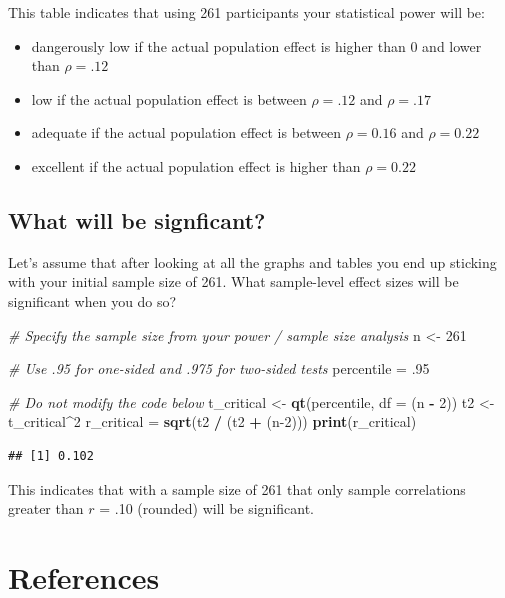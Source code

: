 \documentclass[
]{krantz}
\makeatletter
\newenvironment{Shaded}{\begin{snugshade}}{\end{snugshade}}
\newcommand{\CommentTok}[1]{\textcolor[rgb]{0.37,0.37,0.37}{\textit{#1}}}
\newcommand{\DataTypeTok}[1]{\textcolor[rgb]{0.27,0.27,0.27}{#1}}
\newcommand{\DecValTok}[1]{\textcolor[rgb]{0.06,0.06,0.06}{#1}}
\newcommand{\FloatTok}[1]{\textcolor[rgb]{0.06,0.06,0.06}{#1}}
\newcommand{\KeywordTok}[1]{\textcolor[rgb]{0.27,0.27,0.27}{\textbf{#1}}}
\newcommand{\NormalTok}[1]{#1}
\newcommand{\OperatorTok}[1]{\textcolor[rgb]{0.43,0.43,0.43}{\textbf{#1}}}
\newcommand{\StringTok}[1]{\textcolor[rgb]{0.5,0.5,0.5}{#1}}
\newenvironment{kframe}{%
\medskip{}
\setlength{\fboxsep}{.8em}
 \def\at@end@of@kframe{}%
 \ifinner\ifhmode%
  \def\at@end@of@kframe{\end{minipage}}%
  \begin{minipage}{\columnwidth}%
 \fi\fi%
 \def\FrameCommand##1{\hskip\@totalleftmargin \hskip-\fboxsep
 \colorbox{shadecolor}{##1}\hskip-\fboxsep
     \hskip-\linewidth \hskip-\@totalleftmargin \hskip\columnwidth}%
 \MakeFramed {\advance\hsize-\width
   \@totalleftmargin\z@ \linewidth\hsize
   \@setminipage}}%
 {\par\unskip\endMakeFramed%
 \at@end@of@kframe}
\renewenvironment{Shaded}{\begin{kframe}}{\end{kframe}}
\makeatother
\begin{document}
This table indicates that using 261 participants your statistical power will be:

\begin{itemize}
\item
  dangerously low if the actual population effect is higher than 0 and lower than \(\rho = .12\)
\item
  low if the actual population effect is between \(\rho = .12\) and \(\rho = .17\)
\item
  adequate if the actual population effect is between \(\rho = 0.16\) and \(\rho = 0.22\)
\item
  excellent if the actual population effect is higher than \(\rho = 0.22\)
\end{itemize}

\hypertarget{what-will-be-signficant-2}{%
\subsection{What will be signficant?}\label{what-will-be-signficant-2}}

Let's assume that after looking at all the graphs and tables you end up sticking with your initial sample size of 261. What sample-level effect sizes will be significant when you do so?

\begin{Shaded}
\begin{Highlighting}[]
\CommentTok{# Specify the sample size from your power / sample size analysis}
\NormalTok{n <-}\StringTok{ }\DecValTok{261}

\CommentTok{# Use .95 for one-sided and .975 for two-sided tests}
\NormalTok{percentile =}\StringTok{ }\FloatTok{.95} 

\CommentTok{# Do not modify the code below}
\NormalTok{t_critical <-}\StringTok{ }\KeywordTok{qt}\NormalTok{(percentile, }\DataTypeTok{df =}\NormalTok{ (n }\OperatorTok{-}\StringTok{ }\DecValTok{2}\NormalTok{))}
\NormalTok{t2 <-}\StringTok{ }\NormalTok{t_critical}\OperatorTok{^}\DecValTok{2}
\NormalTok{r_critical =}\StringTok{ }\KeywordTok{sqrt}\NormalTok{(t2 }\OperatorTok{/}\StringTok{ }\NormalTok{(t2 }\OperatorTok{+}\StringTok{ }\NormalTok{(n}\DecValTok{-2}\NormalTok{)))}
\KeywordTok{print}\NormalTok{(r_critical)}
\end{Highlighting}
\end{Shaded}

\begin{verbatim}
## [1] 0.102
\end{verbatim}

This indicates that with a sample size of 261 that only sample correlations greater than \(r\) = .10 (rounded) will be significant.

\hypertarget{references}{%
\section{References}\label{references}}

  

\backmatter
\printindex
\end{document}
